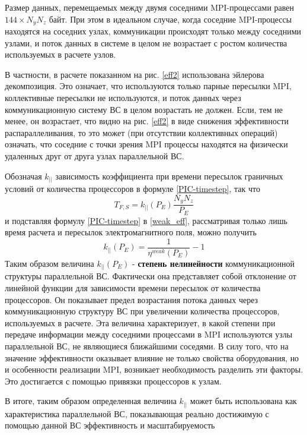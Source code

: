 Размер данных, перемещаемых между двумя соседними MPI-процессами равен $144 \times N_y N_z  $ байт. При этом в идеальном случае, когда соседние MPI-процессы находятся на соседних узлах, коммуникации происходят только между соседними узлами, и поток данных в системе в целом не возрастает с ростом количества используемых в расчете узлов.

В частности, в расчете показанном на рис. \ref{eff2} использована эйлерова декомпозиция. Это означает, что используются только парные пересылки MPI, коллективные пересылки не используются, и поток данных через коммуникационную систему ВС в целом возрастать не должен. Если, тем не менее, он возрастает, что видно на рис. \ref{eff2} в виде снижения эффективности распараллеливания, то это может (при отсутствии коллективных операций) означать, что соседние с точки зрения MPI процессы находятся на физически удаленных друг от друга узлах параллельной ВС.

Обозначая $k_{||}$ зависимость коэффициента при времени пересылок граничных условий от количества процессоров в формуле \ref{PIC-timestep}, так что 
\begin{equation}
T_{F,S} = k_{||} (P_E) \frac{N_y N_z}{P_E}
\end{equation} 
и подставляя формулу \ref{PIC-timestep} в \ref{weak_eff}, рассматривая только лишь время расчета и пересылок электромагнитного поля, можно получить 
\begin{equation}
k_{||} (P_E) = \frac{1}{\eta^{weak}(P_E)} - 1
\end{equation}	  
Таким образом величина $k_{||} (P_E)$  - \textbf{степень нелинейности} коммуникационной структуры параллельной ВС. Фактически она представляет собой отклонение от линейной функции для зависимости времени пересылок от количества процессоров. Он показывает предел возрастания потока данных через коммуникационную структуру ВС при увеличении количества процессоров, используемых в расчете. Эта величина характеризует, в какой степени при передаче информации между соседними процессами в MPI используются узлы параллельной ВС, не являющиеся ближайшими соседями. В силу того, что на значение эффективности оказывает влияние не только свойства оборудования, но и особенности реализации MPI, возникает необходимость разделить эти факторы. Это достигается с помощью привязки процессоров к узлам. 

В итоге, таким образом определенная  величина $k_{||} $ может быть использована как характеристика параллельной ВС, показывающая реально достижимую с помощью данной ВС эффективность и масштабируемость   

